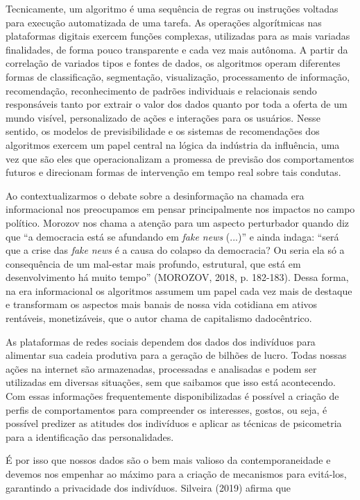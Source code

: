 Tecnicamente, um algoritmo é uma sequência de regras ou instruções
voltadas para execução automatizada de uma tarefa. As operações
algorítmicas nas plataformas digitais exercem funções complexas,
utilizadas para as mais variadas finalidades, de forma pouco
transparente e cada vez mais autônoma. A partir da correlação de
variados tipos e fontes de dados, os algoritmos operam diferentes formas
de classificação, segmentação, visualização, processamento de
informação, recomendação, reconhecimento de padrões individuais e
relacionais sendo responsáveis tanto por extrair o valor dos dados
quanto por toda a oferta de um mundo visível, personalizado de ações e
interações para os usuários. Nesse sentido, os modelos de
previsibilidade e os sistemas de recomendações dos algoritmos exercem um
papel central na lógica da indústria da influência, uma vez que são eles
que operacionalizam a promessa de previsão dos comportamentos futuros e
direcionam formas de intervenção em tempo real sobre tais condutas.

Ao contextualizarmos o debate sobre a desinformação na chamada era
informacional nos preocupamos em pensar principalmente nos impactos no
campo político. Morozov nos chama a atenção para um aspecto perturbador
quando diz que ``a democracia está se afundando em \emph{fake news}
(...)'' e ainda indaga: ``será que a crise das \emph{fake} \emph{news} é
a causa do colapso da democracia? Ou seria ela só a consequência de um
mal-estar mais profundo, estrutural, que está em desenvolvimento há
muito tempo'' (MOROZOV, 2018, p. 182-183). Dessa forma, na era
informacional os algoritmos assumem um papel cada vez mais de destaque e
transformam os aspectos mais banais de nossa vida cotidiana em ativos
rentáveis, monetizáveis, que o autor chama de capitalismo dadocêntrico.

As plataformas de redes sociais dependem dos dados dos indivíduos para
alimentar sua cadeia produtiva para a geração de bilhões de lucro. Todas
nossas ações na internet são armazenadas, processadas e analisadas e
podem ser utilizadas em diversas situações, sem que saibamos que isso
está acontecendo. Com essas informações frequentemente disponibilizadas
é possível a criação de perfis de comportamentos para compreender os
interesses, gostos, ou seja, é possível predizer as atitudes dos
indivíduos e aplicar as técnicas de psicometria para a identificação das
personalidades.

É por isso que nossos dados são o bem mais valioso da contemporaneidade
e devemos nos empenhar ao máximo para a criação de mecanismos para
evitá-los, garantindo a privacidade dos indivíduos. Silveira (2019)
afirma que

